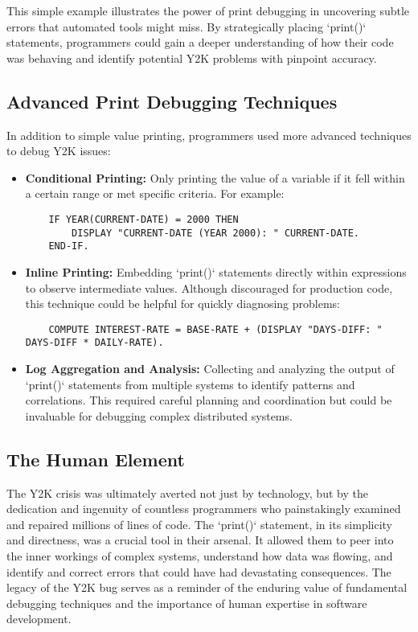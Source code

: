 \documentclass{article}
\begin{document}
{{{{This simple example illustrates the power of print debugging in uncovering subtle errors that automated tools might miss. By strategically placing `print()` statements, programmers could gain a deeper understanding of how their code was behaving and identify potential Y2K problems with pinpoint accuracy.

\subsection*{Advanced Print Debugging Techniques}

In addition to simple value printing, programmers used more advanced techniques to debug Y2K issues:

\begin{itemize}
    \item \textbf{Conditional Printing:} Only printing the value of a variable if it fell within a certain range or met specific criteria. For example:

    \begin{verbatim}
    IF YEAR(CURRENT-DATE) = 2000 THEN
        DISPLAY "CURRENT-DATE (YEAR 2000): " CURRENT-DATE.
    END-IF.
    \end{verbatim}

    \item \textbf{Inline Printing:} Embedding `print()` statements directly within expressions to observe intermediate values. Although discouraged for production code, this technique could be helpful for quickly diagnosing problems:

    \begin{verbatim}
    COMPUTE INTEREST-RATE = BASE-RATE + (DISPLAY "DAYS-DIFF: " DAYS-DIFF * DAILY-RATE).
    \end{verbatim}

    \item \textbf{Log Aggregation and Analysis:} Collecting and analyzing the output of `print()` statements from multiple systems to identify patterns and correlations. This required careful planning and coordination but could be invaluable for debugging complex distributed systems.
\end{itemize}

\subsection*{The Human Element}

The Y2K crisis was ultimately averted not just by technology, but by the dedication and ingenuity of countless programmers who painstakingly examined and repaired millions of lines of code. The `print()` statement, in its simplicity and directness, was a crucial tool in their arsenal. It allowed them to peer into the inner workings of complex systems, understand how data was flowing, and identify and correct errors that could have had devastating consequences. The legacy of the Y2K bug serves as a reminder of the enduring value of fundamental debugging techniques and the importance of human expertise in software development.

}}}}
\end{document}
